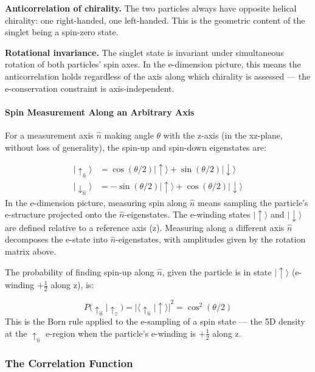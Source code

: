 \documentclass[aps,prd,preprint,superscriptaddress,longbibliography,floatfix]{revtex4-2}
\theoremstyle{remark}
\begin{document}
\textbf{Anticorrelation of chirality.} The two particles always have opposite helical chirality: one right-handed, one left-handed. This is the geometric content of the singlet being a spin-zero state.

\textbf{Rotational invariance.} The singlet state is invariant under simultaneous rotation of both particles' spin axes. In the e-dimension picture, this means the anticorrelation holds regardless of the axis along which chirality is assessed --- the e-conservation constraint is axis-independent.


\paragraph{Spin Measurement Along an Arbitrary Axis}

For a measurement axis \texttt{$\hat{n}$} making angle $\theta$ with the z-axis (in the xz-plane, without loss of generality), the spin-up and spin-down eigenstates are:


\begin{align}
    |\uparrow_{\hat{n}}\rangle &= \cos(\theta/2)|\uparrow\rangle + \sin(\theta/2)|\downarrow\rangle \\
    |\downarrow_{\hat{n}}\rangle &= -\sin(\theta/2)|\uparrow\rangle + \cos(\theta/2)|\downarrow\rangle
\end{align}
In the e-dimension picture, measuring spin along \texttt{$\hat{n}$} means sampling the particle's e-structure projected onto the \texttt{$\hat{n}$}-eigenstates. The e-winding states $|\uparrow\rangle$ and $|\downarrow\rangle$ are defined relative to a reference axis (z). Measuring along a different axis \texttt{$\hat{n}$} decomposes the e-state into \texttt{$\hat{n}$}-eigenstates, with amplitudes given by the rotation matrix above.

The probability of finding spin-up along \texttt{$\hat{n}$}, given the particle is in state $|\uparrow\rangle$ (e-winding $+\tfrac{1}{2}$ along z), is:


\begin{equation}
    P(\uparrow_{\hat{n}} | \uparrow_z) = |\langle\uparrow_{\hat{n}}|\uparrow\rangle|^{2} = \cos^2(\theta/2)
\end{equation}
This is the Born rule applied to the e-sampling of a spin state --- the 5D density at the $\uparrow_{\hat{n}}$ e-region when the particle's e-winding is $+\tfrac{1}{2}$ along z.


\subsubsection{The Correlation Function}
\end{document}
